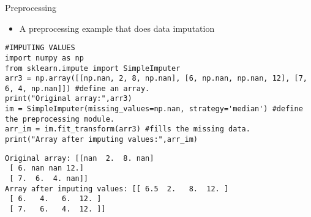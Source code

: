 \documentclass{beamer}
\begin{document}



\begin{frame}[fragile]{Preprocessing}
\begin{itemize}
    \item A preprocessing example that does data imputation
\end{itemize}

\begin{lstlisting}
#IMPUTING VALUES
import numpy as np
from sklearn.impute import SimpleImputer
arr3 = np.array([[np.nan, 2, 8, np.nan], [6, np.nan, np.nan, 12], [7, 6, 4, np.nan]]) #define an array.
print("Original array:",arr3)
im = SimpleImputer(missing_values=np.nan, strategy='median') #define the preprocessing module.
arr_im = im.fit_transform(arr3) #fills the missing data.
print("Array after imputing values:",arr_im)
\end{lstlisting}
\begin{small}
\begin{verbatim}
Original array: [[nan  2.  8. nan]
 [ 6. nan nan 12.]
 [ 7.  6.  4. nan]]
Array after imputing values: [[ 6.5  2.   8.  12. ]
 [ 6.   4.   6.  12. ]
 [ 7.   6.   4.  12. ]]
\end{verbatim}
\end{small}
\end{frame}
\end{document}
